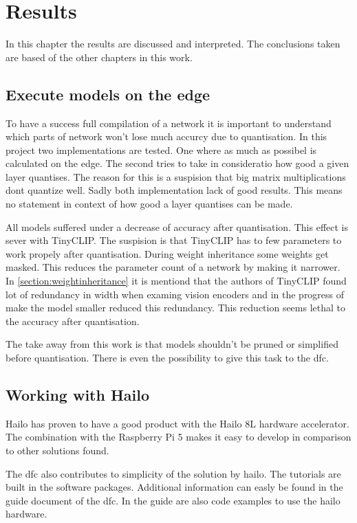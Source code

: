 \chapter{Results}
In this chapter the results are discussed and interpreted.
The conclusions taken are based of the other chapters in this work.

\section{Execute models on the edge}
To have a success full compilation of a network it is important to understand which parts of network won't lose much accurcy due to quantisation.
In this project two implementations are tested.
One where as much as possibel is calculated on the edge.
The second tries to take in consideratio how good a given layer quantises.
The reason for this is a suspision that big matrix multiplications dont quantize well.
Sadly both implementation lack of good results.
This means no statement in context of how good a layer quantises can be made.

All models suffered under a decrease of accuracy after quantisation.
This effect is sever with TinyCLIP.
The suspision is that TinyCLIP has to few parameters to work propely after quantisation.
During weight inheritance some weights get masked.
This reduces the parameter count of a network by making it narrower.
In \cref{section:weightinheritance} it is mentiond that the authors of TinyCLIP found lot of redundancy in width when examing vision encoders and in the progress of make the model smaller reduced this redundancy.
This reduction seems lethal to the accuracy after quantisation.

The take away from this work is that models shouldn't be pruned or simplified before quantisation.
There is even the possibility to give this task to the \acrshort{dfc}.

\section{Working with Hailo}

Hailo has proven to have a good product with the Hailo 8L hardware accelerator.
The combination with the Raspberry Pi 5 makes it easy to develop in comparison to other solutions found.

The \acrshort{dfc} also contributes to simplicity of the solution by hailo.
The tutorials are built in the software packages.
Additional information can easly be found in the guide document of the \acrshort{dfc}.
In the guide are also code examples to use the hailo hardware.

